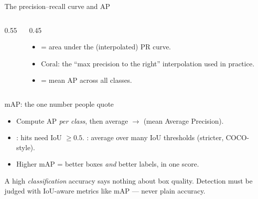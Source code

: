 \documentclass[10pt,aspectratio=169]{beamer}
\begin{document}
\begin{frame}{The precision--recall curve and AP}
  \begin{columns}[T]
    \begin{column}{0.55\textwidth}
      \begin{center}
      \end{center}
    \end{column}
    \begin{column}{0.45\textwidth}
      \begin{itemize}
        \item {} = area under the (interpolated) PR curve.
        \item Coral: the ``max precision to the right'' interpolation used in practice.
        \item {} = mean AP across all classes.
      \end{itemize}
    \end{column}
  \end{columns}
\end{frame}

\begin{frame}{mAP: the one number people quote}
  \begin{itemize}
    \item Compute AP \emph{per class}, then average $\rightarrow$  (mean Average Precision).
    \item {}: hits need IoU $\ge0.5$. : average over many IoU thresholds (stricter, COCO-style).
    \item Higher mAP = better boxes \emph{and} better labels, in one score.
  \end{itemize}
  \begin{badbox}
    A high \emph{classification} accuracy says nothing about box quality. Detection must be judged with IoU-aware metrics like mAP --- never plain accuracy.
  \end{badbox}
\end{frame}
\end{document}
